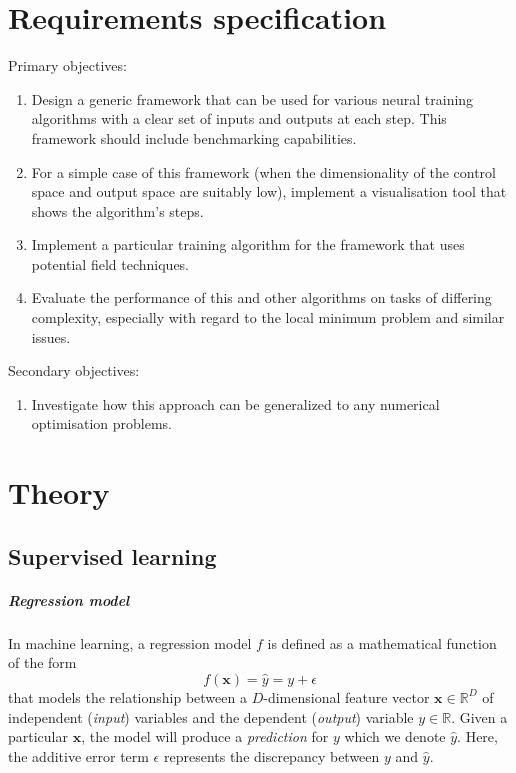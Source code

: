 \documentclass[oneside]{book}
\renewcommand\vec{\mathbf}
\begin{document}
\chapter{Requirements specification}
Primary objectives:
\begin{enumerate}
    \item Design a generic framework that can be used for various neural training algorithms
    with a clear set of inputs and outputs at each step. This framework should include
    benchmarking capabilities.
    \item For a simple case of this framework (when the dimensionality of the control space
    and output space are suitably low), implement a visualisation tool that shows the
    algorithm’s steps.
    \item Implement a particular training algorithm for the framework that uses potential field
    techniques.
    \item Evaluate the performance of this and other algorithms on tasks of differing
    complexity, especially with regard to the local minimum problem and similar issues.
\end{enumerate}
Secondary objectives:
\begin{enumerate}
    \item Investigate how this approach can be generalized to any numerical optimisation problems.
\end{enumerate}

\chapter{Theory}
\section{Supervised learning}

\paragraph{Regression model}
In machine learning, a regression model $f$ is defined as a mathematical function of the form
\begin{equation}
    \label{eq:reg_model}
    f(\vec{x}) = \hat{y} = y + \epsilon
\end{equation}
that models the relationship between a $D$-dimensional feature vector $\vec{x} \in \mathbb{R}^D$ of independent (\textit{input}) variables and the dependent (\textit{output}) variable $y \in \mathbb{R}$. 
Given a particular $\vec{x}$, the model will produce a \textit{prediction} for $y$ which we denote $\hat{y}$.
Here, the additive error term $\epsilon$ represents the discrepancy between $y$ and $\hat{y}$.
\end{document}
